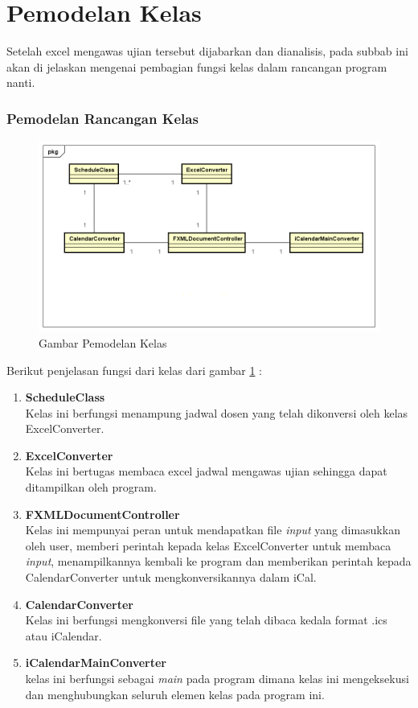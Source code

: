 \section{Pemodelan Kelas}
Setelah excel mengawas ujian tersebut dijabarkan dan dianalisis, pada subbab ini akan di jelaskan mengenai pembagian fungsi
kelas dalam rancangan program nanti.

\subsubsection{Pemodelan Rancangan Kelas}
\begin{figure}[H]
	\centering
	\includegraphics[scale=0.5]{Gambar/pemodelan-kelas}
	\caption{Gambar Pemodelan Kelas}
	\label{fig:pemodelanKelas}
\end{figure}

Berikut penjelasan fungsi dari kelas dari gambar \ref{fig:pemodelanKelas} :	
\begin{enumerate}
	\item \textbf{ScheduleClass}\\
	Kelas ini berfungsi menampung jadwal dosen yang telah dikonversi oleh kelas ExcelConverter.
	\item \textbf{ExcelConverter}\\
	Kelas ini bertugas membaca excel jadwal mengawas ujian sehingga dapat ditampilkan oleh program.
	\item \textbf{FXMLDocumentController}\\
	Kelas ini mempunyai peran untuk mendapatkan file \textit{input} yang dimasukkan oleh user,  memberi perintah 
	kepada kelas ExcelConverter untuk membaca \textit{input}, menampilkannya kembali ke program dan memberikan perintah
	kepada CalendarConverter untuk mengkonversikannya dalam iCal.
	\item \textbf{CalendarConverter}\\
	Kelas ini berfungsi mengkonversi file yang telah dibaca kedala format .ics atau iCalendar.
	\item \textbf{iCalendarMainConverter}\\
	kelas ini berfungsi sebagai \textit{main} pada program dimana kelas ini mengeksekusi dan menghubungkan seluruh elemen kelas 
	pada program ini.
\end{enumerate}
